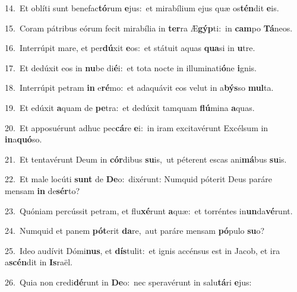 {\numbfont\textcolor{\numbcolor}{14.}}~Et oblíti sunt benefac\-\textbf{tó}\-rum \textbf{e}\-jus:~\star et mirabílium ejus quæ os\-\textbf{tén}\-dit \textbf{e}\-is.\par
{\numbfont\textcolor{\numbcolor}{15.}}~Coram pátribus eórum fecit mirabília in \textbf{ter}\-ra Æ\-\textbf{gýp}\-ti:~\star in \textbf{cam}\-po \textbf{Tá}\-neos.\par
{\numbfont\textcolor{\numbcolor}{16.}}~Interrúpit mare, et per\-\textbf{dú}\-xit \textbf{e}\-os:~\star et státuit aquas \textbf{qua}\-si in \textbf{u}\-tre.\par
{\numbfont\textcolor{\numbcolor}{17.}}~Et dedúxit eos in \textbf{nu}\-be di\-\textbf{é}\-i:~\star et tota nocte in illuminati\-\textbf{ó}\-ne \textbf{i}\-gnis.\par
{\numbfont\textcolor{\numbcolor}{18.}}~Interrúpit petram \textbf{in} e\-\textbf{ré}\-mo:~\star et adaquávit eos velut in a\-\textbf{býs}\-so \textbf{mul}\-ta.\par
{\numbfont\textcolor{\numbcolor}{19.}}~Et edúxit \textbf{a}\-quam de \textbf{pe}\-tra:~\star et dedúxit tamquam \textbf{flú}\-mina \textbf{a}\-quas.\par
{\numbfont\textcolor{\numbcolor}{20.}}~Et apposuérunt adhuc pec\-\textbf{cá}\-re \textbf{e}\-i:~\star in iram excitavérunt Excélsum in \textbf{in}\-a\-\textbf{quó}\-so.\par
{\numbfont\textcolor{\numbcolor}{21.}}~Et tentavérunt Deum in \textbf{cór}\-dibus \textbf{su}\-is,~\star ut péterent escas ani\-\textbf{má}\-bus \textbf{su}\-is.\par
{\numbfont\textcolor{\numbcolor}{22.}}~Et male locúti \textbf{sunt} de \textbf{De}\-o:~\star dixérunt: Numquid póterit Deus paráre mensam \textbf{in} de\-\textbf{sér}\-to?\par
{\numbfont\textcolor{\numbcolor}{23.}}~Quóniam percússit petram, et flu\-\textbf{xé}\-runt \textbf{a}\-quæ:~\star et torréntes in\-\textbf{un}\-da\-\textbf{vé}\-runt.\par
{\numbfont\textcolor{\numbcolor}{24.}}~Numquid et panem \textbf{pót}\-erit \textbf{da}\-re,~\star aut paráre mensam \textbf{pó}\-pulo \textbf{su}\-o?\par
{\numbfont\textcolor{\numbcolor}{25.}}~Ideo audívit Dómi\-\textbf{nus}\-, et \textbf{dís}\-tulit:~\star et ignis accénsus est in Jacob, et ira a\-\textbf{scén}\-dit in \textbf{Is}\-raël.\par
{\numbfont\textcolor{\numbcolor}{26.}}~Quia non credi\-\textbf{dé}\-runt in \textbf{De}\-o:~\star nec speravérunt in salu\-\textbf{tá}\-ri \textbf{e}\-jus:\par
